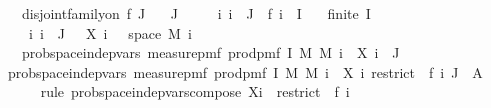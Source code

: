 \begin{isabellebody}
\ \ \ {\isachardoublequoteopen}disjoint{\isacharunderscore}{\kern0pt}family{\isacharunderscore}{\kern0pt}on\ f\ J{\isachardoublequoteclose}\isanewline
\ \ \ {\isachardoublequoteopen}J\ {\isasymnoteq}\ {\isacharbraceleft}{\kern0pt}{\isacharbraceright}{\kern0pt}{\isachardoublequoteclose}\isanewline
\ \ \ {\isachardoublequoteopen}{\isasymAnd}i{\isachardot}{\kern0pt}\ i\ {\isasymin}\ J\ {\isasymLongrightarrow}\ f\ i\ {\isasymsubseteq}\ I{\isachardoublequoteclose}\isanewline
\ \ \ {\isachardoublequoteopen}finite\ I{\isachardoublequoteclose}\isanewline
\ \ \ {\isachardoublequoteopen}{\isasymAnd}{\isasymomega}\ i{\isachardot}{\kern0pt}\ i\ {\isasymin}\ J\ {\isasymLongrightarrow}\ \ X\ i\ {\isasymomega}\ {\isasymin}\ space\ {\isacharparenleft}{\kern0pt}M{\isacharprime}{\kern0pt}\ i{\isacharparenright}{\kern0pt}{\isachardoublequoteclose}\isanewline
\ \ \ {\isachardoublequoteopen}prob{\isacharunderscore}{\kern0pt}space{\isachardot}{\kern0pt}indep{\isacharunderscore}{\kern0pt}vars\ {\isacharparenleft}{\kern0pt}measure{\isacharunderscore}{\kern0pt}pmf\ {\isacharparenleft}{\kern0pt}prod{\isacharunderscore}{\kern0pt}pmf\ I\ M{\isacharparenright}{\kern0pt}{\isacharparenright}{\kern0pt}\ M{\isacharprime}{\kern0pt}\ {\isacharparenleft}{\kern0pt}{\isasymlambda}i\ {\isasymomega}{\isachardot}{\kern0pt}\ X\ i\ {\isasymomega}{\isacharparenright}{\kern0pt}\ J{\isachardoublequoteclose}\isanewline
%
\isadelimproof
%
\endisadelimproof
%
\isatagproof
{}\isamarkupfalse%
\ {\isacharminus}{\kern0pt}\isanewline
\ \ \isamarkupfalse%
\ {\isachardoublequoteopen}prob{\isacharunderscore}{\kern0pt}space{\isachardot}{\kern0pt}indep{\isacharunderscore}{\kern0pt}vars\ {\isacharparenleft}{\kern0pt}measure{\isacharunderscore}{\kern0pt}pmf\ {\isacharparenleft}{\kern0pt}prod{\isacharunderscore}{\kern0pt}pmf\ I\ M{\isacharparenright}{\kern0pt}{\isacharparenright}{\kern0pt}\ M{\isacharprime}{\kern0pt}\ {\isacharparenleft}{\kern0pt}{\isasymlambda}i\ {\isasymomega}{\isachardot}{\kern0pt}\ X\ i\ {\isacharparenleft}{\kern0pt}restrict\ {\isasymomega}\ {\isacharparenleft}{\kern0pt}f\ i{\isacharparenright}{\kern0pt}{\isacharparenright}{\kern0pt}{\isacharparenright}{\kern0pt}\ J{\isachardoublequoteclose}\ {\isacharparenleft}{\kern0pt}\ {\isacharquery}{\kern0pt}A{\isacharparenright}{\kern0pt}\isanewline
\ \ \ \ \isamarkupfalse%
\ {\isacharparenleft}{\kern0pt}rule\ prob{\isacharunderscore}{\kern0pt}space{\isachardot}{\kern0pt}indep{\isacharunderscore}{\kern0pt}vars{\isacharunderscore}{\kern0pt}compose{}{\isacharbrackleft}{\kern0pt}\ X{\isacharequal}{\kern0pt}{\isachardoublequoteopen}{\isasymlambda}i\ {\isasymomega}{\isachardot}{\kern0pt}\ restrict\ {\isasymomega}\ {\isacharparenleft}{\kern0pt}f\ i{\isacharparenright}{\kern0pt}{\isachardoublequoteclose}{\isacharbrackright}{\kern0pt}{\isacharparenright}{\kern0pt}\isanewline

\end{isabellebody}
